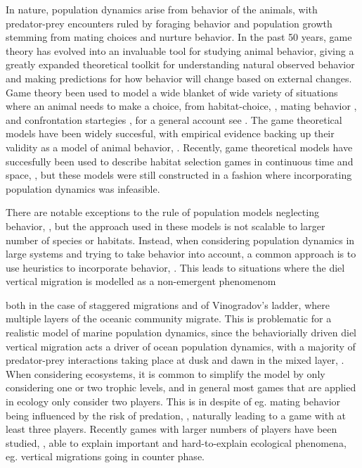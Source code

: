 In nature, population dynamics arise from behavior of the animals, with predator-prey encounters ruled by foraging behavior and population growth stemming from mating choices and nurture behavior. In the past 50 years, game theory has evolved into an invaluable tool for studying animal behavior, giving a greatly expanded theoretical toolkit for understanding natural observed behavior and making predictions for how behavior will change based on external changes. Game theory been used to model a wide blanket of wide variety of situations where an animal needs to make a choice, from habitat-choice, \citep{krivan1997dynamic}, mating behavior  \citep{rapoport1967exploiter}, and confrontation startegies \citep{smith1973logic}, for a general account see \citep{broom2013game}. The game theoretical models have been widely succesful, with empirical evidence backing up their validity as a model of animal behavior, \citep{cooper1989communication,empirical_trait,behaviorial_effects}. Recently, game theoretical models have succesfully been used to describe habitat selection games in continuous time and space, \citep{jerome,verticalmigration}, but these models were still constructed in a fashion where incorporating population dynamics was infeasible.

 There are notable exceptions to the rule of population models neglecting behavior, \citep{Krivan1998,genkai2007macrophyte, sadowski2019predator, cressman2010ideal,}, but the approach used in these models is not scalable to larger number of species or habitats. Instead, when considering population dynamics in large systems and trying to take behavior into account, a common approach is to use heuristics to incorporate behavior, \citep{ho2019predation}. This leads to situations where the diel vertical migration is modelled as a non-emergent phenomenom \citep{van2018global} %

 both in the case of staggered migrations and of  Vinogradov's ladder, where multiple layers of the oceanic community migrate. This is problematic for a realistic model of marine population dynamics, since the behaviorially driven diel vertical migration acts a driver of ocean population dynamics, with a majority of predator-prey interactions taking place at dusk and dawn in the mixed layer,  \citep{benoit2014critical}. When considering ecosystems, it is common to simplify the model by only considering one or two trophic levels, and in general most games that are applied in ecology only consider two players. This is in despite of eg. mating behavior being influenced by the risk of predation, \citep{carranza1999red,lima2009predators}, naturally leading to a game with at least three players. Recently games with larger numbers of players have been studied, \citep{pinti2019trophic}, able to explain important and hard-to-explain ecological phenomena, eg. vertical migrations going in counter phase.

